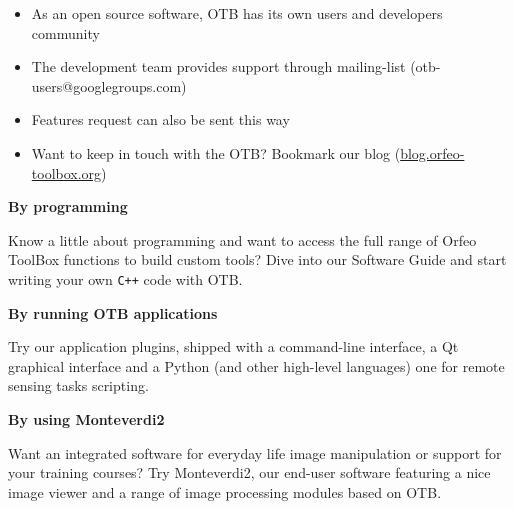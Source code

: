\documentclass[portrait,a0]{a0poster}
\newenvironment{poster}{
  \begin{center}
  \begin{minipage}[c]{0.99\textwidth}
}{
  \end{minipage} 
  \end{center}
}
\newcommand{\titresection}[1]{ 
 	\begin{center}
 	\huge \textbf{\color{c2}{#1}}
 	
 	

 	
 	\end{center}
 }
\newcommand{\titresubsection}[1]{ 
 	\begin{center}
 	\Large{\textbf{#1}}
 	\end{center}
 }
\begin{document}
\begin{poster}
\begin{minipage}[t]{\textwidth}
\begin{minipage}[t]{0.3\textwidth}
\begin{minipage}[t]{\textwidth}
{\begin{itemize}
\item As an open source software, OTB has its own users and developers
  community
\item The development team provides support through mailing-list
  (otb-users@googlegroups.com)
\item Features request can also be sent this way
\item Want to keep in touch with the OTB? Bookmark our blog (\url{blog.orfeo-toolbox.org})
\end{itemize}
}
\end{minipage}
\end{minipage}
\end{minipage}

\begin{minipage}[t]{\textwidth}
\titresection{\sc How can I use Orfeo ToolBox ?}
\vspace{0.5cm}
\begin{minipage}[t]{0.3\textwidth}
\titresubsection{By programming} \Large{Know a little about
  programming and want to access the full range of Orfeo ToolBox
  functions to build custom tools? Dive into our Software Guide and
  start writing your own \verb!C++! code with OTB. 

}

\end{minipage}
\hfill
\begin{minipage}[t]{0.3\textwidth}
\titresubsection{By running OTB applications} 

\Large{ Try our application
  plugins, shipped with a command-line interface, a Qt graphical
  interface and a Python (and other high-level languages) one for
  remote sensing tasks scripting.
}
\end{minipage}
\hfill
\begin{minipage}[t]{0.3\textwidth}
\titresubsection{By using Monteverdi2} 

\Large{ Want an integrated software for everyday life image
  manipulation or support for your training courses? Try Monteverdi2,
  our end-user software featuring a nice image viewer and a range of
  image processing modules based on OTB.
}

\end{minipage}
\end{minipage}

\vspace{1cm}


\end{poster}
\end{document}
